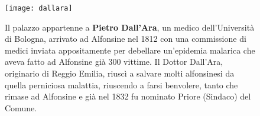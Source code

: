  \begin{figure}[htb]
    \centering
    \texttt{[image: dallara]}
    \caption[Palazzo Dall'Ara]{Il palazzo appartenne a \textbf{Pietro Dall'Ara}, un medico dell'Università di Bologna, arrivato ad Alfonsine nel 1812 con una commissione di medici inviata appositamente per debellare un'epidemia malarica che aveva fatto ad Alfonsine già 300 vittime. Il Dottor Dall'Ara, originario di Reggio Emilia, riuscì a salvare molti alfonsinesi da quella perniciosa malattia, riuscendo a farsi benvolere, tanto che rimase ad Alfonsine e già nel 1832 fu nominato Priore (Sindaco) del Comune.\label{fig:dallara}}
\end{figure}












































%